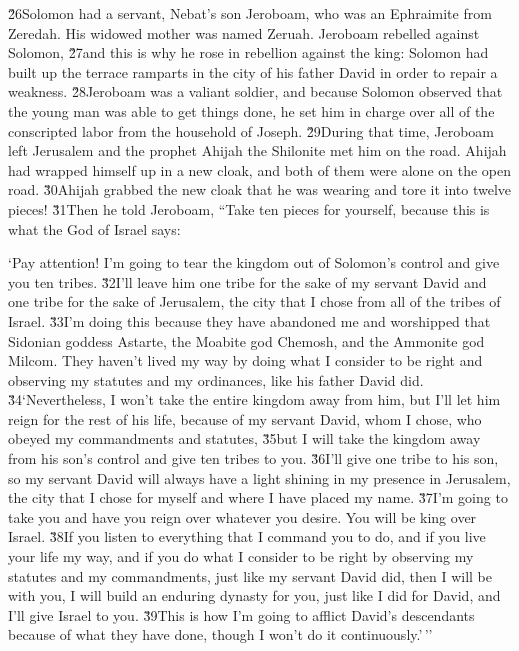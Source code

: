 \v{26}Solomon had a servant, Nebat's son Jeroboam, who was an Ephraimite from Zeredah. His widowed mother was named Zeruah. Jeroboam rebelled against Solomon, \v{27}and this is why he rose in rebellion against the king: Solomon had built up the terrace ramparts in the city of his father David in order to repair a weakness. \v{28}Jeroboam was a valiant soldier, and because Solomon observed that the young man was able to get things done, he set him in charge over all of the conscripted labor from the household of Joseph. \v{29}During that time, Jeroboam left Jerusalem and the prophet Ahijah the Shilonite met him on the road. Ahijah had wrapped himself up in a new cloak, and both of them were alone on the open road. \v{30}Ahijah grabbed the new cloak that he was wearing and tore it into twelve pieces! \v{31}Then he told Jeroboam, ``Take ten pieces for yourself, because this is what the  God of Israel says:

\begin{poetry}
\poeml `Pay attention! I'm going to tear the kingdom out of Solomon's control and give you ten tribes. \v{32}I'll leave him one tribe for the sake of my servant David and one tribe for the sake of Jerusalem, the city that I chose from all of the tribes of Israel. \v{33}I'm doing this because they have abandoned me and worshipped that Sidonian goddess Astarte, the Moabite god Chemosh, and the Ammonite god Milcom. They haven't lived my way by doing what I consider to be right and observing my statutes and my ordinances, like his father David did. \\
\poeml \v{34}`Nevertheless, I won't take the entire kingdom away from him, but I'll let him reign for the rest of his life, because of my servant David, whom I chose, who obeyed my commandments and statutes, \v{35}but I will take the kingdom away from his son's control and give ten tribes to you. \v{36}I'll give one tribe to his son, so my servant David will always have a light shining in my presence in Jerusalem, the city that I chose for myself and where I have placed my name. \v{37}I'm going to take you and have you reign over whatever you desire. You will be king over Israel. \v{38}If you listen to everything that I command you to do, and if you live your life my way, and if you do what I consider to be right by observing my statutes and my commandments, just like my servant David did, then I will be with you, I will build an enduring dynasty for you, just like I did for David, and I'll give Israel to you. \v{39}This is how I'm going to afflict David's descendants because of what they have done, though I won't do it continuously.'\,''
\end{poetry}

